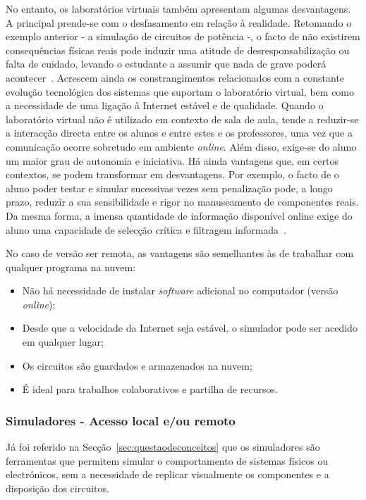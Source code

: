 No entanto, os laboratórios virtuais também apresentam algumas desvantagens. A principal prende-se com o desfasamento em relação à realidade. Retomando o exemplo anterior - a simulação de circuitos de potência -, o facto de não existirem consequências físicas reais pode induzir uma atitude de desresponsabilização ou falta de cuidado, levando o estudante a assumir que nada de grave poderá acontecer~\cite{POTKONJAK2016309}. Acrescem ainda os constrangimentos relacionados com a constante evolução tecnológica dos sistemas que suportam o laboratório virtual, bem como a necessidade de uma ligação à Internet estável e de qualidade. Quando o laboratório virtual não é utilizado em contexto de sala de aula, tende a reduzir-se a interacção directa entre os alunos e entre estes e os professores, uma vez que a comunicação ocorre sobretudo em ambiente \textit{online}. Além disso, exige-se do aluno um maior grau de autonomia e iniciativa. Há ainda vantagens que, em certos contextos, se podem transformar em desvantagens. Por exemplo, o facto de o aluno poder testar e simular sucessivas vezes sem penalização pode, a longo prazo, reduzir a sua sensibilidade e rigor no manuseamento de componentes reais. Da mesma forma, a imensa quantidade de informação disponível online exige do aluno uma capacidade de selecção crítica e filtragem informada~\cite{POTKONJAK2016309, vabtegensVL, Gherasim, Ghergulescu2019Feb}.

No caso de versão ser remota, as vantagens são semelhantes às de trabalhar com qualquer programa na nuvem:
\begin{itemize}
    \item Não há necessidade de instalar \textit{software} adicional no computador (versão \textit{online});
    \item Desde que a velocidade da Internet seja estável, o simulador pode ser acedido em qualquer lugar;
    \item Os circuitos são guardados e armazenados na nuvem;
    \item É ideal para trabalhos colaborativos e partilha de recursos.
\end{itemize}

\subsubsection{Simuladores - Acesso local e/ou remoto}
Já foi referido na Secção~\ref{sec:questaodeconceitos} que os simuladores são ferramentas que permitem simular o comportamento de sistemas físicos ou electrónicos, sem a necessidade de replicar visualmente os componentes e a disposição dos circuitos. 

